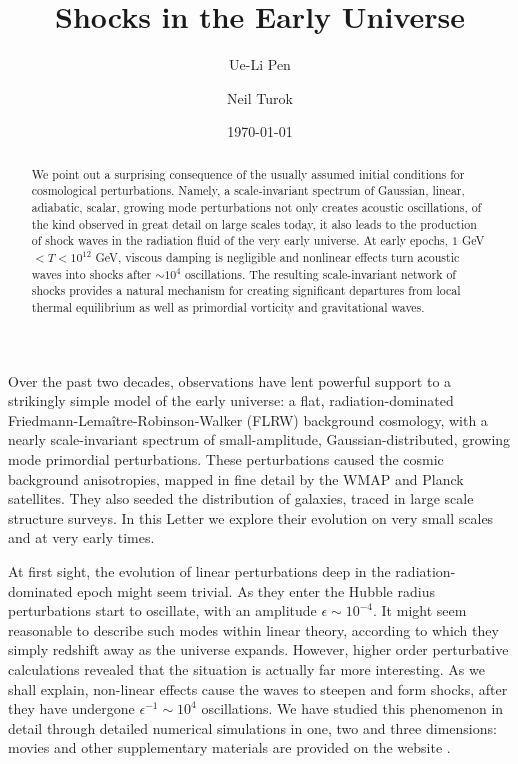 \documentclass[prl,aps,10pt,twocolumn,showkeys,nofootinbib]{revtex4-1}
\begin{document}
\title{Shocks in the Early Universe}


\author{Ue-Li Pen }

\author{Neil Turok}


\date{\today}


\begin{abstract}
We point out a surprising consequence of the usually assumed initial conditions for cosmological perturbations. 
Namely, a scale-invariant spectrum of Gaussian, linear, adiabatic, scalar, growing mode perturbations not only creates acoustic oscillations, of the kind observed in great detail on large scales today, it also leads to the production of shock waves in the radiation fluid of the very early universe. At early epochs, $1$ GeV$<T<10^{12}$ GeV, viscous damping is negligible and nonlinear effects turn acoustic waves into shocks after $\sim 10^4$ oscillations. The resulting scale-invariant network of shocks provides a natural mechanism for creating significant departures from local thermal equilibrium as well as primordial vorticity and gravitational waves. 
\end{abstract}


\maketitle

Over the past two decades, observations have lent powerful support to a strikingly simple model of the early universe: a flat, radiation-dominated Friedmann-Lema\^{i}tre-Robinson-Walker (FLRW) background cosmology, with a nearly scale-invariant spectrum of small-amplitude, Gaussian-distributed, growing mode primordial perturbations. These perturbations caused the cosmic background anisotropies, mapped in fine detail by the WMAP and Planck satellites. They also seeded the distribution of galaxies, traced in large scale structure surveys. In this Letter we explore their evolution on very small scales and at very early times.  

At first sight, the evolution of linear perturbations deep in the radiation-dominated epoch might seem trivial. As they enter the Hubble radius perturbations start to oscillate, with an amplitude $\epsilon \sim10^{-4}$. It might seem reasonable to describe such modes within linear theory, according to which they simply redshift away as the universe expands. However, higher order perturbative calculations \cite{Gielen} revealed that the situation is actually far more interesting. As we shall explain, non-linear effects cause the waves to steepen and form shocks, after they have undergone $\epsilon^{-1} \sim 10^{4}$ oscillations. We have studied this phenomenon in detail through detailed numerical simulations in one, two and three dimensions: movies and other supplementary materials are provided on the website \cite{weblink}. 
\end{document}
